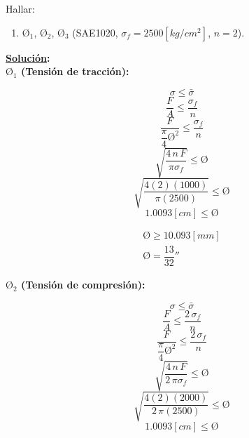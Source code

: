 \documentclass[letter,10pt,twoside]{article}
\begin{document}
Hallar:
\begin{enumerate}
    \item $\text{\O}_1$, $\text{\O}_2$, $\text{\O}_3$ (SAE1020, $\sigma_f=2500[kg/cm^2]$, $n=2$).
\end{enumerate}

\textbf{\underline{Solución}:} \\

\textbf{$\text{\O}_1$ (Tensión de tracción):}

\begin{equation*}
    \sigma \le \bar{\sigma}
\end{equation*}
\begin{equation*}
    \frac{F}{A} \le \frac{\sigma_f}{n}
\end{equation*}
\begin{equation*}
    \frac{F}{\dfrac{\pi}{4} \text{\O}^2} \le \frac{\sigma_f}{n}
\end{equation*}
\begin{equation*}
    \sqrt{\frac{4\,n\,F}{\pi\sigma_f}} \le \text{\O}
\end{equation*}
\begin{equation*}
    \sqrt{\frac{4(2)(1000)}{\pi(2500)}} \le \text{\O}
\end{equation*}
\begin{equation*}
    1.0093[cm] \le \text{\O}
\end{equation*}

\begin{equation*}
\boxed{
    \begin{array}{l}
        \text{\O} \ge 10.093[mm] \\
        \text{\O} = \dfrac{13}{32}''
    \end{array}
}
\end{equation*}

\textbf{$\text{\O}_2$ (Tensión de compresión):}

\begin{equation*}
    \sigma \le \bar{\sigma}
\end{equation*}
\begin{equation*}
    \frac{F}{A} \le \frac{2\,\sigma_f}{n}
\end{equation*}
\begin{equation*}
    \frac{F}{\dfrac{\pi}{4} \text{\O}^2} \le \frac{2\,\sigma_f}{n}
\end{equation*}
\begin{equation*}
    \sqrt{\frac{4\,n\,F}{2\,\pi\sigma_f}} \le \text{\O}
\end{equation*}
\begin{equation*}
    \sqrt{\frac{4(2)(2000)}{2\,\pi(2500)}} \le \text{\O}
\end{equation*}
\begin{equation*}
    1.0093[cm] \le \text{\O}
\end{equation*}
\end{document}

